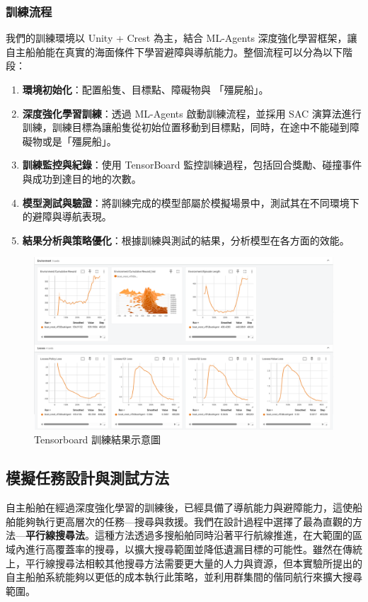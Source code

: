 \documentclass[12pt,a4paper]{article}
\begin{document}
\subsubsection{訓練流程}
我們的訓練環境以 Unity + Crest 為主，結合 ML-Agents 深度強化學習框架，讓自主船舶能在真實的海面條件下學習避障與導航能力。整個流程可以分為以下階段：
\begin{enumerate}
    \item \textbf{環境初始化}：配置船隻、目標點、障礙物與 「殭屍船」。
    \item \textbf{深度強化學習訓練}：透過 ML-Agents 啟動訓練流程，並採用 SAC 演算法進行訓練，訓練目標為讓船隻從初始位置移動到目標點，同時，在途中不能碰到障礙物或是「殭屍船」。
    \item \textbf{訓練監控與紀錄}：使用 TensorBoard 監控訓練過程，包括回合獎勵、碰撞事件與成功到達目的地的次數。
    \item \textbf{模型測試與驗證}：將訓練完成的模型部屬於模擬場景中，測試其在不同環境下的避障與導航表現。
    \item \textbf{結果分析與策略優化}：根據訓練與測試的結果，分析模型在各方面的效能。
\end{enumerate}

\begin{figure}[h]
    \centering
    \includegraphics[scale=0.3]{image/Tensorboard.png}
    \caption{Tensorboard 訓練結果示意圖}
\end{figure}

\subsection{模擬任務設計與測試方法}
自主船舶在經過深度強化學習的訓練後，已經具備了導航能力與避障能力，這使船舶能夠執行更高層次的任務—搜尋與救援。我們在設計過程中選擇了最為直觀的方法—\textbf{平行線搜尋法}。這種方法透過多搜船舶同時沿著平行航線推進，在大範圍的區域內進行高覆蓋率的搜尋，以擴大搜尋範圍並降低遺漏目標的可能性。雖然在傳統上，平行線搜尋法相較其他搜尋方法需要更大量的人力與資源，但本實驗所提出的自主船舶系統能夠以更低的成本執行此策略，並利用群集間的偕同航行來擴大搜尋範圍。
\end{document}
